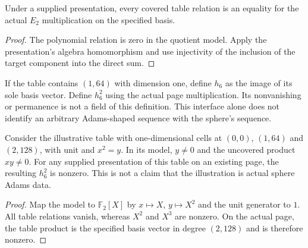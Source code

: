 \begin{lemma}
  \label{lem:adams-e2-table-product}
  Under a supplied presentation, every covered table relation is an
  equality for the actual $E_2$ multiplication on the specified basis.
\end{lemma}
\begin{proof}
  The polynomial relation is zero in the quotient model.  Apply the
  presentation's algebra homomorphism and use injectivity of the inclusion
  of the target component into the direct sum.
\end{proof}

\begin{definition}
  \label{def:adams-e2-imported-h6}
  If the table contains $(1,64)$ with dimension one, define $h_6$ as the
  image of its sole basis vector.  Define $h_6^2$ using the actual page
  multiplication.  Its nonvanishing or permanence is not a field of this
  definition.  This interface alone does not identify an arbitrary
  Adams-shaped sequence with the sphere's sequence.
\end{definition}

\begin{lemma}
  \label{lem:adams-e2-three-cell-example}
  Consider the illustrative table with one-dimensional cells at $(0,0)$,
  $(1,64)$ and $(2,128)$, with unit and $x^2=y$.  In its model, $y\ne0$
  and the uncovered product $xy\ne0$.  For any supplied presentation of
  this table on an existing page, the resulting $h_6^2$ is nonzero.
  This is not a claim that the illustration is actual sphere Adams data.
\end{lemma}
\begin{proof}
  Map the model to $\mathbb F_2[X]$ by $x\mapsto X$, $y\mapsto X^2$
  and the unit generator to $1$.  All table relations vanish, whereas
  $X^2$ and $X^3$ are nonzero.  On the actual page, the table product is
  the specified basis vector in degree $(2,128)$ and is therefore nonzero.
\end{proof}

